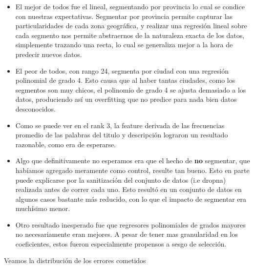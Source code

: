 \begin{itemize}
    \item El mejor de todos fue el lineal, segmentando por provincia lo cual se condice con nuestras expectativas. Segmentar por provincia permite capturar las particularidades de cada zona geográfica, y realizar una regresión lineal sobre cada segmento nos permite abstraernos de la naturaleza exacta de los datos, simplemente trazando una recta, lo cual se generaliza mejor a la hora de predecir nuevos datos.
    
    \item El peor de todos, con rango 24, segmenta por ciudad con una regresión polinomial de grado 4. Esto causa que al haber tantas ciudades, como los segmentos son muy chicos, el polinomio de grado 4 se ajusta demasiado a los datos, produciendo así un overfitting que no predice para nada bien datos desconocidos.
    
    \item Como se puede ver en el rank 3, la feature derivada de las frecuencias promedio de las palabras del titulo y descripción lograron un resultado razonable, como era de esperarse.
    
    \item Algo que definitivamente no esperamos era que el hecho de \textbf{no} segmentar, que habíamos agregado meramente como control, resulte tan bueno. Esto en parte puede explicarse por la sanitización del conjunto de datos (i.e dropna) realizada antes de correr cada uno. Esto resultó en un conjunto de datos en algunos casos bastante más reducido, con lo que el impacto de segmentar era muchísimo menor.
    
    \item Otro resultado inesperado fue que regresores polinomiales de grados mayores no necesariamente eran mejores. A pesar de tener mas granularidad en los coeficientes, estos fueron especialmente propensos a sesgo de selección.

\end{itemize}

Veamos la distribución de los errores cometidos

